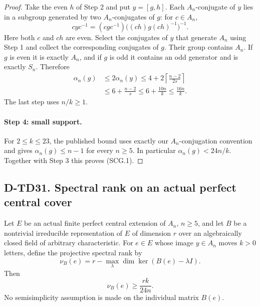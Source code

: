 \begin{proof}
Take the even $h$ of Step 2 and put $y=[g,h]$.
Each $A_n$-conjugate of $y$ lies in a subgroup generated by two
$A_n$-conjugates of $g$: for $c\in A_n$,
\[
 c y c^{-1}
    =(c g c^{-1})\bigl((c h)g(c h)^{-1}\bigr)^{-1}.
    \tag{SCG.9}
\]
Here both $c$ and $ch$ are even. Select the conjugates of $y$
that generate $A_n$ using Step 1 and collect the corresponding
conjugates of $g$. Their group contains $A_n$. If $g$ is even it
is exactly $A_n$, and if $g$ is odd it contains an odd generator
and is exactly $S_n$. Therefore
\[
 \begin{split}
 \alpha_n(g)&\le2\alpha_n(y)
       \le4+2\left\lceil\frac{n-2}{2s}\right\rceil\\
       &\le6+\frac{n-2}{s}
        \le6+\frac{10n}{k}\le\frac{16n}{k}.
 \end{split}
 \tag{SCG.10}
\]
The last step uses $n/k\ge1$.

\paragraph{Step 4: small support.}
For $2\le k\le23$, the published bound
\cite[Lemma6.1, pp.547--548]{SF:GuralnickSaxl2003Conjugates}
uses exactly our $A_n$-conjugation convention and gives
$\alpha_n(g)\le n-1$ for every $n\ge5$.
In particular $\alpha_n(g)<24n/k$.
Together with Step 3 this proves (SCG.1).
\end{proof}

\subsection*{D-TD31. Spectral rank on an actual perfect central cover}

\begin{theorem}[D-TD31]
Let $E$ be an actual finite perfect central extension of $A_n$,
$n\ge5$, and let $B$ be a nontrivial irreducible representation of
$E$ of dimension $r$ over an algebraically closed field of arbitrary
characteristic. For $e\in E$ whose image $y\in A_n$ moves $k>0$
letters, define the projective spectral rank by
\[
           \nu_B(e)=r-\max_{\lambda}\dim\ker(B(e)-\lambda I).
           \tag{SCG.11}
\]
Then
\[
                       \nu_B(e)\ge\frac{r k}{24n}.
                       \tag{SCG.12}
\]
No semisimplicity assumption is made on the individual matrix $B(e)$.
\end{theorem}

